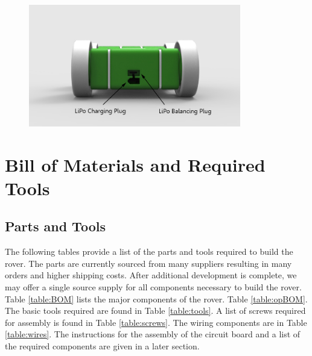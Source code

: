 \documentclass[12pt,titlepage,oneside]{memoir}
\begin{document}
\begin{figure}[!htbp]
\includegraphics[width=350px]{render/pibotback.jpg}
\centering
\end{figure}

\pagebreak
\chapter{Bill of Materials and Required Tools}
\section{Parts and Tools}

The following tables provide a list of the parts and tools required to build the rover. The parts are currently sourced from many suppliers resulting in many orders and higher shipping costs. 
After additional development is complete, we may offer a single source supply for all components necessary to build the rover. Table \ref{table:BOM} lists the major components of the rover. Table \ref{table:opBOM}. The basic tools required are found in Table \ref{table:tools}. A list of screws required for assembly is found in Table \ref{table:screws}. The wiring components are in Table \ref{table:wires}. The instructions for the assembly of the circuit board and a list of the required components are given in a later section.
\end{document}
